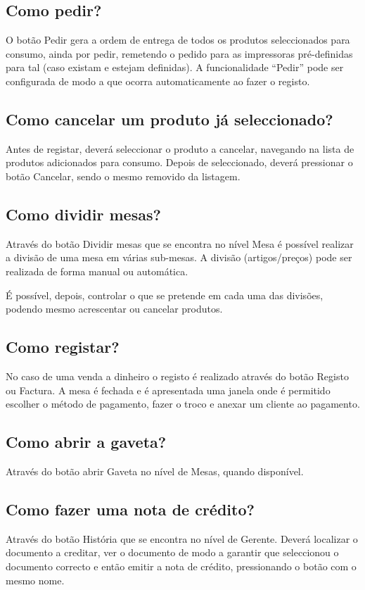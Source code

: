 \documentclass[a4paper,11pt,openany]{memoir}
\begin{document}
\subsection{Como pedir?}
O botão Pedir gera a ordem de entrega de todos os produtos seleccionados para
consumo, ainda por pedir, remetendo o pedido para as impressoras pré-definidas
para tal (caso existam e estejam definidas). A funcionalidade “Pedir” pode ser
configurada de modo a que ocorra automaticamente ao fazer o registo.

\subsection{Como cancelar um produto já seleccionado?}
Antes de registar, deverá seleccionar o produto a cancelar, navegando na lista de
produtos adicionados para consumo. Depois de seleccionado, deverá pressionar o
botão Cancelar, sendo o mesmo removido da listagem.


\subsection{Como dividir mesas?}
Através do botão Dividir mesas que se encontra no nível Mesa é possível realizar a
divisão de uma mesa em várias sub-mesas. A divisão (artigos/preços) pode ser
realizada de forma manual ou automática.

É possível, depois, controlar o que se pretende em cada uma das divisões, podendo mesmo acrescentar ou cancelar
produtos.


\subsection{Como registar?}
No caso de uma venda a dinheiro o registo é realizado através do botão Registo ou
Factura. A mesa é fechada e é apresentada uma janela onde é permitido escolher o
método de pagamento, fazer o troco e anexar um cliente ao pagamento.

\subsection{Como abrir a gaveta?}
Através do botão abrir Gaveta no nível de Mesas, quando disponível.


\subsection{Como fazer uma nota de crédito?}
Através do botão História que se encontra no nível de Gerente. Deverá localizar o
documento a creditar, ver o documento de modo a garantir que seleccionou o
documento correcto e então emitir a nota de crédito, pressionando o botão com o
mesmo nome.
\end{document}

